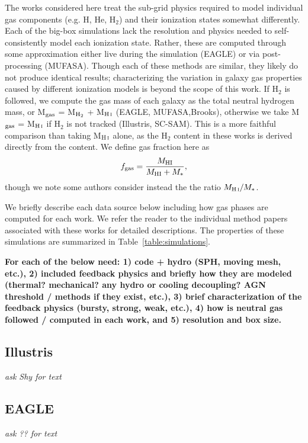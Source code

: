 \documentclass[fleqn,usenatbib]{mnras}
\begin{document}
The works considered here treat the sub-grid physics required to model individual gas components (e.g. H, He, H$_2$) and their ionization states somewhat differently. Each of the big-box simulations lack the resolution and physics needed to self-consistently model each ionization state. Rather, these are computed through some approximation either live during the simulation (EAGLE) or via post-processing (MUFASA). Though each of these methods are similar, they likely do not produce identical results; characterizing the variation in galaxy gas properties caused by different ionization models is beyond the scope of this work. If H$_2$ is followed, we compute the gas mass of each galaxy as the total neutral hydrogen mass, or M$_{\rm gas}$ = M$_{\rm H_2}$ + M$_{\rm \ion{H}{i}}$ (EAGLE, MUFASA,Brooks), otherwise we take M$_{\rm gas}$ = M$_{\rm \ion{H}{i}}$ if H$_2$ is not tracked (Illustris, SC-SAM). This is a more faithful comparison than taking M$_{\rm \ion{H}{i}}$ alone, as the H$_2$ content in these works is derived directly from the  content. We define gas fraction here as
\begin{equation}
f_{\rm gas} = \frac{M_{\rm HI}}{M_{\rm HI} + M_{*}},
\end{equation}
though we note some authors consider instead the the ratio $M_{\ion{H}{i}} / M_{*}$.

We briefly describe each data source below including how gas phases are computed for each work. We refer the reader to the individual method papers associated with these works for detailed descriptions. The properties of these simulations are summarized in Table~\ref{table:simulations}.

{\bf For each of the below need: 1) code + hydro (SPH, moving mesh, etc.), 2) included feedback physics and briefly how they are modeled (thermal? mechanical? any hydro or cooling decoupling? AGN threshold / methods if they exist, etc.), 3) brief characterization of the feedback physics (bursty, strong, weak, etc.), 4) how is neutral gas followed / computed in each work, and 5) resolution and box size.}
\subsection{Illustris}
\label{sec:illustris method}
{\it ask Shy for text}

\subsection{EAGLE}
\label{sec:EAGLE method}
{\it ask ?? for text}
\end{document}
